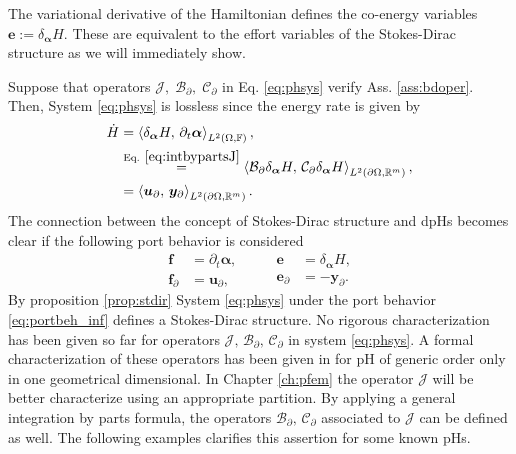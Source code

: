 \begin{remark}
	The variational derivative of the Hamiltonian defines the co-energy variables $\bm{e}:=\delta_{\bm{\alpha}} H$. These are equivalent to the effort variables of the Stokes-Dirac structure as we will immediately show.
\end{remark}

Suppose that operators $\mathcal{J}, \; \mathcal{B}_\partial, \;  \mathcal{C}_\partial$ in Eq. \ref{eq:phsys} verify Ass. \ref{ass:bdoper}. Then, System \eqref{eq:phsys} is lossless since the energy rate is  given by 
\begin{equation}\label{eq:enrate}
\begin{aligned}
\dot{H} &= \inner[L^2(\Omega, \bbF)]{\delta_{\bm{\alpha}} H}{\partial_t \bm{\alpha}}, \\
&\stackrel{\text{Eq. } \eqref{eq:intbypartsJ}}{=} \inner[L^2(\partial\Omega, \bbR^m)]{\mathcal{B}_\partial \delta_{\bm{\alpha}} H}{\mathcal{C}_\partial \delta_{\bm{\alpha}} H}, \\
&= \inner[L^2(\partial\Omega, \bbR^m)]{\bm{u}_\partial}{\bm{y}_\partial}. \
\end{aligned}
\end{equation} 
The connection between the concept of Stokes-Dirac structure and dpHs becomes clear if the following port behavior is considered
\begin{equation}\label{eq:portbeh_inf}
\begin{aligned}
\bm{f} &= \partial_t \bm{\alpha}, \\
\bm{f}_\partial &= \bm{u}_\partial, 
\end{aligned} \qquad
\begin{aligned}
\bm{e} &= \delta_{\bm{\alpha}} H, \\
\bm{e}_\partial &= -\bm{y}_\partial. 
\end{aligned}
\end{equation}
By proposition \eqref{prop:stdir} System \eqref{eq:phsys} under the port behavior \eqref{eq:portbeh_inf} defines a Stokes-Dirac structure.  
No rigorous characterization has been given so far for operators $\mathcal{J}, \, \mathcal{B_\partial,\, C_\partial}$ in system \eqref{eq:phsys}. A formal characterization of these operators has been given in \cite{legorrec2005} for pH of generic order only in one geometrical dimensional. In Chapter \ref{ch:pfem} the operator $\mathcal{J}$ will be better characterize using an appropriate partition. By applying a general integration by parts formula, the operators $\mathcal{B_\partial,\, C_\partial}$ associated to $\mathcal{J}$ can be defined as well. The following examples clarifies this assertion for some known pHs.


